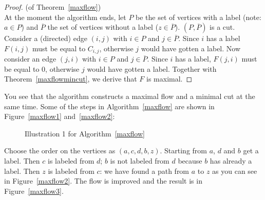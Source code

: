 \begin{proof} (of Theorem~\ref{maxflow})\\
At the moment the algorithm ends, let $P$ be the set of vertices with
a label (note: $a \in P$) and $\overline{P}$ the set of vertices
without a label ($z \in \overline{P}$). $(P,\overline{P})$ is a cut.
Consider a (directed) edge $(i,j)$ with $i \in P$ and $j \in
\overline{P}$.  Since $i$ has a label $F(i,j)$ must be equal to
$C_{i,j}$, otherwise $j$ would have gotten a label. Now consider an
edge $(j,i)$ with $i \in P$ and $j \in \overline{P}$. Since $i$ has a
label, $F(j,i)$ must be equal to 0, otherwise $j$ would have gotten a
label. Together with Theorem~\ref{maxflowmincut}, we derive that $F$
is maximal.
\end{proof}

You see that the algorithm constructs a maximal flow
and a minimal cut at the same time. Some of the steps in Algorithm~\ref{maxflow} are
shown in Figure~\ref{maxflow1} and~\ref{maxflow2}:

\begin{figure}[ht]
\begin{center}
\hspace{1cm} 
\end{center}
\caption{Illustration 1 for Algorithm~\ref{maxflow}}
\end{figure}

Choose the order on the vertices as $(a,c,d,b,z)$. Starting from $a$,
$d$ and $b$ get a label. Then $c$ is labeled from $d$; $b$ is not
labeled from $d$ because $b$ has already a label. Then $z$ is labeled
from $c$: we have found a path from $a$ to $z$ as you can see in
Figure~\ref{maxflow2}. The flow is improved and the result is in
Figure~\ref{maxflow3}.

